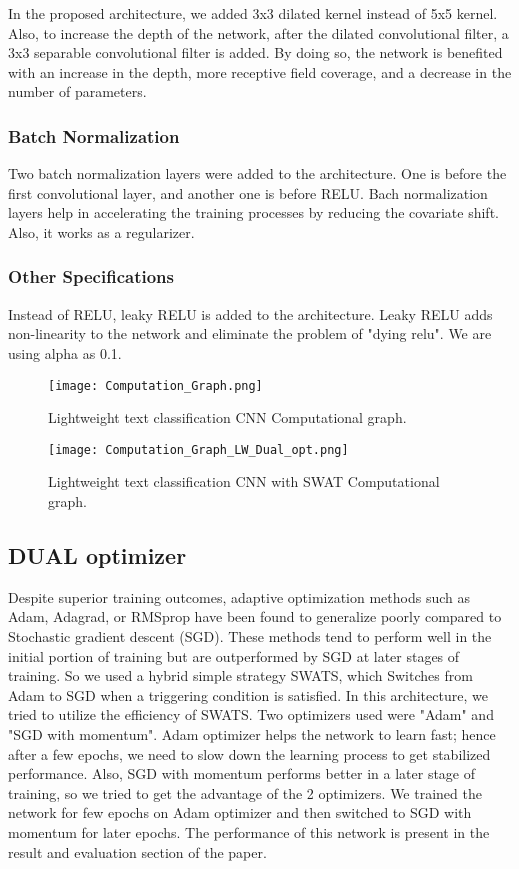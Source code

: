 \documentclass[conference]{IEEEtran}
\begin{document}
In the proposed architecture, we added 3x3 dilated kernel instead of 5x5 kernel. Also, to increase the depth of the network, after the dilated convolutional filter, a 3x3 separable convolutional filter is added. By doing so, the network is benefited with an increase in the depth, more receptive field coverage, and a decrease in the number of parameters.

\subsubsection{Batch Normalization}
Two batch normalization layers were added to the architecture. One is before the first convolutional layer, and another one is before RELU. Bach normalization layers help in accelerating the training processes by reducing the covariate shift. Also, it works as a regularizer.

\subsubsection{Other Specifications}
Instead of RELU, leaky RELU is added to the architecture. Leaky RELU adds non-linearity to the network and eliminate the problem of "dying relu". We are using alpha as 0.1.

\begin{figure*}[htbp]
\centerline{\texttt{[image: Computation\_Graph.png]}}
\caption{Lightweight text classification CNN Computational graph.}
\label{fig}
\end{figure*}

\begin{figure*}[htbp]
\centerline{\texttt{[image: Computation\_Graph\_LW\_Dual\_opt.png]}}
\caption{Lightweight text classification CNN with SWAT Computational graph.}
\label{fig}
\end{figure*}
\subsection{DUAL optimizer}
Despite superior training outcomes, adaptive optimization methods such as Adam, Adagrad, or RMSprop have been found to generalize poorly compared to Stochastic gradient descent (SGD). These methods tend to perform well in the initial
portion of training but are outperformed by SGD at later stages of training. So we used a hybrid simple strategy SWATS, which Switches from Adam to SGD when a triggering condition is satisfied.
In this architecture, we tried to utilize the efficiency of SWATS. Two optimizers used were "Adam" and "SGD with momentum". Adam optimizer helps the network to learn fast; hence after a few epochs, we need to slow down the learning process to get stabilized performance. Also, SGD with momentum performs better in a later stage of training, so we tried to get the advantage of the 2 optimizers. We trained the network for few epochs on Adam optimizer and then switched to SGD with momentum for later epochs. The performance of this network is present in the result and evaluation section of the paper.
\end{document}
